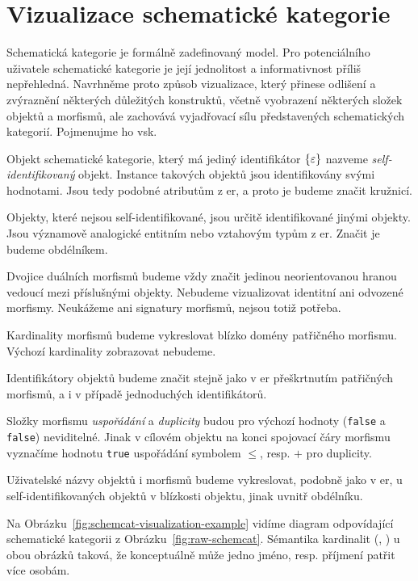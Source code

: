 \section{Vizualizace schematické kategorie}\label{section:vsk}

Schematická kategorie je formálně zadefinovaný model.
Pro potenciálního uživatele schematické kategorie je její jednolitost a informativnost příliš nepřehledná.
Navrhněme proto způsob vizualizace, který přinese odlišení a zvýraznění některých důležitých konstruktů, včetně vyobrazení některých složek objektů a morfismů, ale zachovává vyjadřovací sílu představených schematických kategorií.
Pojmenujme ho \acrfull{vsk}.

Objekt schematické kategorie, který má jediný identifikátor $\left\{\varepsilon\right\}$ nazveme \emph{self-identifikovaný} objekt.
Instance takových objektů jsou identifikovány svými hodnotami.
Jsou tedy podobné atributům z \acrshort{er}, a proto je budeme značit kružnicí.

Objekty, které nejsou self-identifikované, jsou určitě identifikované jinými objekty.
Jsou významově analogické entitním nebo vztahovým typům z \acrshort{er}.
Značit je budeme obdélníkem.

Dvojice duálních morfismů budeme vždy značit jedinou neorientovanou hranou vedoucí mezi příslušnými objekty.
Nebudeme vizualizovat identitní ani odvozené morfismy.
Neukážeme ani signatury morfismů, nejsou totiž potřeba.

Kardinality morfismů budeme vykreslovat blízko domény patřičného morfismu.
Výchozí kardinality zobrazovat nebudeme.

Identifikátory objektů budeme značit stejně jako v \acrshort{er} přeškrtnutím patřičných morfismů, a i v případě jednoduchých identifikátorů.

Složky morfismu \emph{uspořádání} a \emph{duplicity} budou pro výchozí hodnoty (\texttt{false} a \texttt{false}) neviditelné.
Jinak v cílovém objektu na konci spojovací čáry morfismu vyznačíme hodnotu \texttt{true} uspořádání symbolem $\leq$, resp. $+$ pro duplicity.

Uživatelské názvy objektů i morfismů budeme vykreslovat, podobně jako v \acrshort{er}, u self-identifikovaných objektů v blízkosti objektu, jinak uvnitř obdélníku.

Na Obrázku~\ref{fig:schemcat-visualization-example} vidíme diagram odpovídající schematické kategorii z Obrázku~\ref{fig:raw-schemcat}.
Sémantika kardinalit (\one, \many) u obou obrázků taková, že konceptuálně může jedno jméno, resp. příjmení patřit více osobám.

